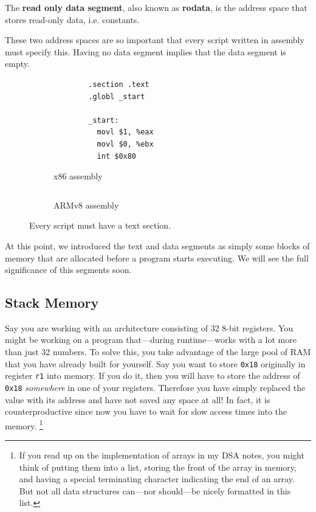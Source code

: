   \begin{definition}
    The \textbf{read only data segment}, also known as \textbf{rodata}, is the address space that stores read-only data, i.e. constants. 
  \end{definition}

  These two address spaces are so important that every script written in assembly must specify this. Having no data segment implies that the data segment is empty. 

  \begin{figure}[H]
    \centering
    \begin{subfigure}[b]{0.48\textwidth}
      \centering
      \begin{lstlisting}
        .section .text
        .globl _start

        _start:
          movl $1, %eax 
          movl $0, %ebx 
          int $0x80  
      \end{lstlisting}
      \caption{x86 assembly}
    \end{subfigure}
    \hfill 
    \begin{subfigure}[b]{0.48\textwidth}
      \centering
      \begin{lstlisting}
      \end{lstlisting}
      \caption{ARMv8 assembly}
    \end{subfigure}
    \caption{Every script must have a text section.}
  \end{figure}

  At this point, we introduced the text and data segments as simply some blocks of memory that are allocated before a program starts executing. We will see the full significance of this segments soon. 

\subsection{Stack Memory} 

  Say you are working with an architecture consisting of 32 8-bit registers. You might be working on a program that---during runtime---works with a lot more than just 32 numbers. To solve this, you take advantage of the large pool of RAM that you have already built for yourself. Say you want to store \texttt{0x18} originally in register \texttt{r1} into memory. If you do it, then you will have to store the address of \texttt{0x18} \textit{somewhere} in one of your registers. Therefore you have simply replaced the value with its address and have not saved any space at all! In fact, it is counterproductive since now you have to wait for slow access times into the memory. \footnote{If you read up on the implementation of arrays in my DSA notes, you might think of putting them into a list, storing the front of the array in memory, and having a special terminating character indicating the end of an array. But not all data structures can---nor should---be nicely formatted in this list.}

